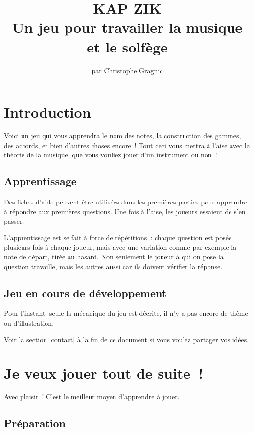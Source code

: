 \documentclass[11pt]{article}
\title{\vspace{-5em}
KAP ZIK \\
\vspace{1em}
Un jeu pour travailler la musique et le solfège}
\author{par Christophe Gragnic}
\date{}
\begin{document}
\maketitle

\setcounter{tocdepth}{2}
\tableofcontents

\newpage

\section{Introduction}

Voici un jeu qui vous apprendra le nom des notes, la construction des
gammes, des accords, et bien d’autres choses encore ! Tout ceci vous mettra
à l’aise avec la théorie de la musique, que vous vouliez jouer d’un instrument
ou non !

\subsection{Apprentissage}

Des fiches d’aide peuvent être utilisées dans les premières parties pour
apprendre à répondre aux premières questions. Une fois à l’aise, les joueurs
essaient de s’en passer.

L’apprentissage est se fait à force de répétitions : chaque question est posée
plusieurs fois à chaque joueur, mais avec une variation comme par exemple la
note de départ, tirée au hasard. Non seulement le joueur à qui on pose la
question travaille, mais les autres aussi car ils doivent vérifier la réponse.

\subsection{Jeu en cours de développement}

Pour l’instant, seule la mécanique du jeu est décrite, il n’y a pas encore de
thème ou d’illustration.

Voir la section \ref{contact} à la fin de ce document si vous voulez partager
vos idées.

\section{Je veux jouer tout de suite !}

Avec plaisir ! C’est le meilleur moyen d’apprendre à jouer.

\subsection{Préparation}
\end{document}
